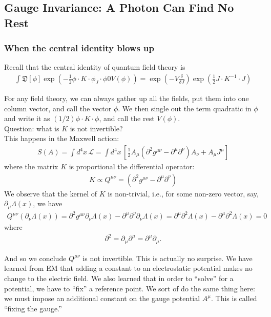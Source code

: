 \documentclass{book}
\theoremstyle{definition}
\newcommand{\p}{\partial}
\newcommand{\lag}{\mathcal{L}}
\newcommand{\f}[2]{\frac{#1}{#2}}
\newcommand{\lp}{\left(}
\newcommand{\rp}{\right)}
\newcommand{\lb}{\left[}
\newcommand{\rb}{\right]}
\begin{document}
\subsection{Gauge Invariance: A Photon Can Find No Rest}






\subsubsection{When the central identity blows up}

Recall that the central identity of quantum field theory is
\begin{align}
\boxed{\int \mathfrak{D}[\phi] \exp\lp -\f{1}{2}\phi \cdot K \cdot \phi _ J\cdot \phi 0 V(\phi) \rp = \exp\lp -V\f{\delta }{\delta J} \rp \exp\lp \f{1}{2}J\cdot K^{-1} \cdot J \rp}
\end{align}



For any field theory, we can always gather up all the fields, put them into one column vector, and call the vector $\phi$. We then single out the term quadratic in $\phi$ and write it as $(1/2)\phi \cdot K \cdot \phi$, and call the rest $V(\phi)$. \\

Question: what is $K$ is not invertible? \\

This happens in the Maxwell action:
\begin{align}
\boxed{S(A) = \int d^4x\,\lag = \int d^4x\, \lb \f{1}{2}A_\mu (\p^2 g^{\mu\nu} - \p^\mu \p^\nu)A_\nu + A_\mu J^\mu \rb}
\end{align}
where the matrix $K$ is proportional the differential operator:
\begin{align}
K \propto Q^{\mu\nu} = (\p^2 g^{\mu\nu} - \p^\mu \p^\nu)
\end{align}
We observe that the kernel of $K$ is non-trivial, i.e., for some non-zero vector, say, $\p_\mu \Lambda(x)$, we have
\begin{align}
Q^{\mu\nu}(\p_\nu \Lambda(x)) = \p^2g^{\mu\nu}\p_\nu \Lambda(x) - \p^\mu\p^\nu\p_\nu \Lambda(x) = \p^\mu \p^2 \Lambda(x) - \p^\mu \p^2 \Lambda(x) = 0
\end{align}
where
\begin{align}
\p^2 = \p_\mu \p^\mu= \p^\mu \p_\mu.
\end{align}

And so we conclude $Q^{\mu\nu}$ is not invertible. This is actually no surprise. We have learned from EM that adding a constant to an electrostatic potential makes no change to the electric field. We also learned that in order to ``solve'' for a potential, we have to ``fix'' a reference point. We sort of do the same thing here: we must impose an additional constant on the gauge potential $A^\mu$. This is called ``fixing the gauge.''
\end{document}
